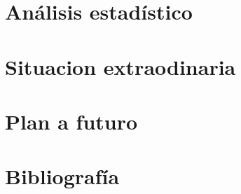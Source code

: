 \documentclass[15pt, letterpaper]{article}
\begin{document}
\section{Análisis estadístico}

\section{Situacion extraodinaria}

\section{Plan a futuro}

\section{Bibliografía}
\end{document}
